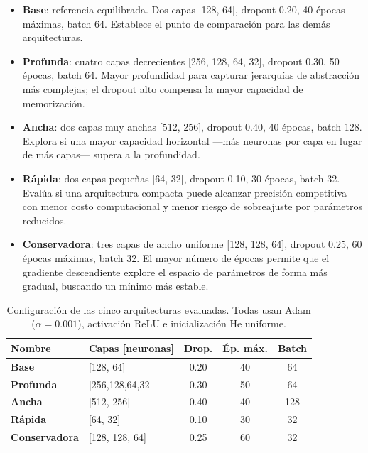 \documentclass[12pt, a4paper]{report}
\newcommand{\modelo}[1]{\textbf{#1}}
\begin{document}
\begin{itemize}
  \item \modelo{Base}: referencia equilibrada. Dos capas [128, 64], dropout 0.20, 40 épocas máximas, batch 64. Establece el punto de comparación para las demás arquitecturas.
  \item \modelo{Profunda}: cuatro capas decrecientes [256, 128, 64, 32], dropout 0.30, 50 épocas, batch 64. Mayor profundidad para capturar jerarquías de abstracción más complejas; el dropout alto compensa la mayor capacidad de memorización.
  \item \modelo{Ancha}: dos capas muy anchas [512, 256], dropout 0.40, 40 épocas, batch 128. Explora si una mayor capacidad horizontal ---más neuronas por capa en lugar de más capas--- supera a la profundidad.
  \item \modelo{Rápida}: dos capas pequeñas [64, 32], dropout 0.10, 30 épocas, batch 32. Evalúa si una arquitectura compacta puede alcanzar precisión competitiva con menor costo computacional y menor riesgo de sobreajuste por parámetros reducidos.
  \item \modelo{Conservadora}: tres capas de ancho uniforme [128, 128, 64], dropout 0.25, 60 épocas máximas, batch 32. El mayor número de épocas permite que el gradiente descendiente explore el espacio de parámetros de forma más gradual, buscando un mínimo más estable.
\end{itemize}

\begin{table}[H]
\centering
\caption{Configuración de las cinco arquitecturas evaluadas. Todas usan Adam ($\alpha=0.001$), activación ReLU e inicialización He uniforme.}
\label{tab:arquitecturas}
\begin{tabular}{@{} l l c c c @{}}
\toprule
\textbf{Nombre} & \textbf{Capas [neuronas]} & \textbf{Drop.} & \textbf{Ép. máx.} & \textbf{Batch} \\
\midrule
\modelo{Base}         & [128, 64]        & 0.20 & 40 & 64  \\
\modelo{Profunda}     & [256,128,64,32]  & 0.30 & 50 & 64  \\
\modelo{Ancha}        & [512, 256]       & 0.40 & 40 & 128 \\
\modelo{Rápida}       & [64, 32]         & 0.10 & 30 & 32  \\
\modelo{Conservadora} & [128, 128, 64]   & 0.25 & 60 & 32  \\
\bottomrule
\end{tabular}
\end{table}
\end{document}
